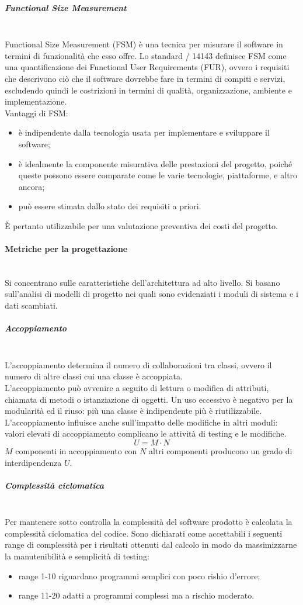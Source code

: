 \subparagraph{Functional Size Measurement}\mbox{}\\
Functional Size Measurement (FSM) è una tecnica per misurare il software in termini di funzionalità che esso offre. Lo standard / 14143 definisce FSM come una quantificazione dei Functional User Requirements (FUR), ovvero i requisiti che descrivono ciò che il software dovrebbe fare in termini di compiti e servizi, escludendo quindi le costrizioni in termini di qualità, organizzazione, ambiente e implementazione.\\
Vantaggi di FSM:
\begin{itemize}
	\item è indipendente dalla tecnologia usata per implementare e sviluppare il software;
	\item è idealmente la componente misurativa delle prestazioni del progetto, poiché queste possono essere comparate come le varie tecnologie, piattaforme, e altro ancora;
	\item può essere stimata dallo stato dei requisiti a priori.
\end{itemize}
\`{E} pertanto utilizzabile per una valutazione preventiva dei costi del progetto.

\paragraph{Metriche per la progettazione}\mbox{}\\
Si concentrano sulle caratteristiche dell'architettura ad alto livello. Si basano sull'analisi di modelli di progetto nei quali sono evidenziati i moduli di sistema e i dati scambiati.

\subparagraph{Accoppiamento}\mbox{}\\
L'accoppiamento determina il numero di collaborazioni tra classi, ovvero il numero di altre classi cui una classe è accoppiata.\\
L'accoppiamento può avvenire a seguito di lettura o modifica di attributi, chiamata di metodi o istanziazione di oggetti. Un uso eccessivo è negativo per la modularità ed il riuso: più una classe è indipendente più è riutilizzabile. L'accoppiamento influisce anche sull'impatto delle modifiche in altri moduli: valori elevati di accoppiamento complicano le attività di testing e le modifiche.
\[ U = M \cdot N \]
$M$ componenti in accoppiamento con $N$ altri componenti producono un grado di interdipendenza $U$.

\subparagraph{Complessità ciclomatica}\mbox{}\\
Per mantenere sotto controlla la complessità del software prodotto è calcolata la complessità ciclomatica del codice. 
Sono dichiarati come accettabili i seguenti range di complessità per i risultati ottenuti dal calcolo in modo da massimizzarne la manutenibilità e semplicità di testing: 
\begin{itemize}
	\item range 1-10 riguardano programmi semplici con poco rishio d'errore;
	\item range 11-20 adatti a programmi complessi ma a rischio moderato.
\end{itemize}

